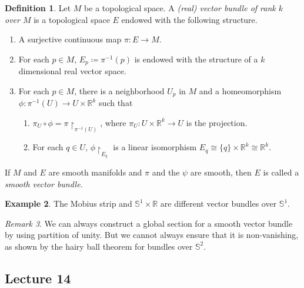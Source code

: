 \documentclass[10pt,letterpaper,cm]{nupset}
\theoremstyle{definition}
\newtheorem{definition}{Definition}[subsection]
\newtheorem{exmp}[definition]{Example}
\theoremstyle{theorem}
\theoremstyle{remark}
\newtheorem{remark}[definition]{Remark}
\newcommand{\R}{\mathbb R}
\renewcommand{\S}{\mathbb S}
\newcommand{\1}{\mathbf{1}}
\newcommand{\0}{\vec 0}
\begin{document}
\begin{definition}
Let $M$ be a topological space. A \textit{(real) vector bundle of rank $k$ over $M$} is a topological space $E$ endowed with the following structure.
\begin{enumerate}
\item A surjective continuous map $\pi : E \to M$.
\item For each $p \in M$, $E_p\coloneqq  \pi^{-1}(p)$ is endowed with the structure of a $k$ dimensional real vector space.
\item For each $p\in M$, there is a neighborhood $U_p$ in $M$ and a homeomorphism $\phi :\pi^{-1}(U) \to U \times \R^k$ such that
\begin{enumerate}
\item $\pi_U \circ \phi  = \pi \restriction_{\pi^{-1}(U)}$, where $\pi_U : U \times \R^k \to U$ is the projection.
\item For each $q\in U$, $\phi \restriction_{E_q}$ is a linear isomorphism $E_q \cong \{q\} \times \R^k \cong \R^k.$
\end{enumerate}
\end{enumerate}
If $M$ and $E$ are smooth manifolds and $\pi$ and the $\psi$ are smooth, then $E$ is called a \textit{smooth vector bundle}.
\end{definition}

\begin{exmp}
The Mobius strip and $\S^1 \times \R$ are different vector bundles over $\S^1$.
\end{exmp}

\begin{remark}
We can always construct a global section for a smooth vector bundle by using partition of unity. But we cannot always ensure that it is non-vanishing, as shown by the hairy ball theorem for bundles over $\S^2$.
\end{remark}

\subsection{Lecture 14}
\end{document}
